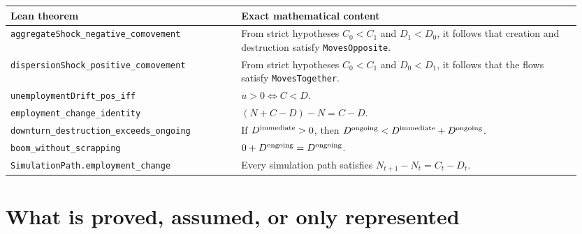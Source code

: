 \documentclass[11pt]{article}
\newcommand{\code}[1]{\texttt{#1}}
\newcommand{\breakcode}[1]{\nolinkurl{#1}}
\begin{document}
\begin{longtable}{@{}p{0.38\linewidth}p{0.57\linewidth}@{}}
\toprule
\textbf{Lean theorem} & \textbf{Exact mathematical content} \\
\midrule
\endhead
\breakcode{aggregateShock_negative_comovement} & From strict hypotheses
$C_0<C_1$ and $D_1<D_0$, it follows that creation and destruction satisfy
\code{MovesOpposite}. \\
\breakcode{dispersionShock_positive_comovement} & From strict hypotheses
$C_0<C_1$ and $D_0<D_1$, it follows that the flows satisfy \code{MovesTogether}. \\
\breakcode{unemploymentDrift_pos_iff} &
$\dot u>0\Longleftrightarrow C<D$. \\
\breakcode{employment_change_identity} &
$(N+C-D)-N=C-D$. \\
\breakcode{downturn_destruction_exceeds_ongoing} & If
$D^{\rm immediate}>0$, then
$D^{\rm ongoing}<D^{\rm immediate}+D^{\rm ongoing}$. \\
\breakcode{boom_without_scrapping} &
$0+D^{\rm ongoing}=D^{\rm ongoing}$. \\
\breakcode{SimulationPath.employment_change} & Every simulation path satisfies
$N_{t+1}-N_t=C_t-D_t$. \\
\bottomrule
\end{longtable}

\section{What is proved, assumed, or only represented}
\label{sec:scope}
\end{document}
